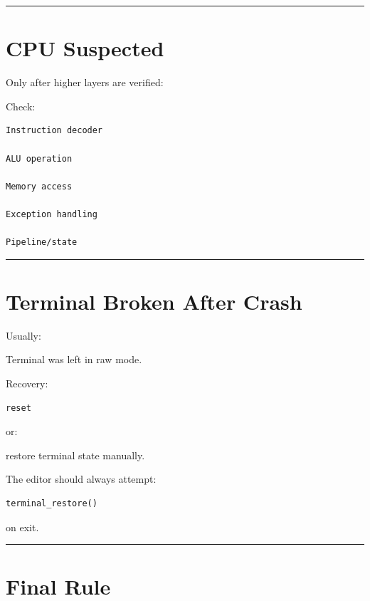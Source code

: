 \documentclass[
  oneside,
  openany]{book}
\begin{document}
\begin{center}\rule{0.5\linewidth}{0.5pt}\end{center}

\hypertarget{cpu-suspected}{%
\section{CPU Suspected}\label{cpu-suspected}}

Only after higher layers are verified:

Check:

\begin{verbatim}
Instruction decoder

ALU operation

Memory access

Exception handling

Pipeline/state
\end{verbatim}

\begin{center}\rule{0.5\linewidth}{0.5pt}\end{center}

\hypertarget{terminal-broken-after-crash}{%
\section{Terminal Broken After
Crash}\label{terminal-broken-after-crash}}

Usually:

Terminal was left in raw mode.

Recovery:

\begin{verbatim}
reset
\end{verbatim}

or:

restore terminal state manually.

The editor should always attempt:

\begin{verbatim}
terminal_restore()
\end{verbatim}

on exit.

\begin{center}\rule{0.5\linewidth}{0.5pt}\end{center}

\hypertarget{final-rule}{%
\section{Final Rule}\label{final-rule}}
\end{document}
